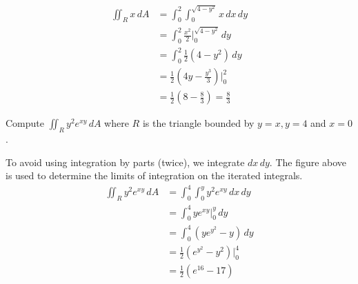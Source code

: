\documentclass[handout]{ximera}
\begin{document}
\begin{example}[Example 2]
\begin{align*}
\iint_R x \, dA & = \int_0^2 \int_0^{\sqrt{4 - y^2}} x \, dx \, dy\\
                 & = \int_0^2  \frac{x^2}{2} \bigg|_{0}^{\sqrt{4 - y^2}} \, dy\\
                 & = \int_0^2  \frac12(4-y^2) \, dy\\
                 &= \frac12 \left(4y - \frac{y^3}{3}\right)  \bigg|_0^2\\
                 &= \frac12 \left(8 - \frac83\right) = \frac{8}{3}
\end{align*} 





\end{example}


\begin{example}[Example 3]
Compute $\iint_R y^2 e^{xy} \, dA$ where $R$ is the triangle bounded by $y = x, y=4$ and $x=0$.\\

\begin{image}
\end{image}

To avoid using integration by parts (twice), we integrate $dx\, dy$.  
The figure above is used to determine the limits of integration on the iterated integrals.
\begin{align*}
\iint_R y^2 e^{xy} \, dA & = \int_0^4 \int_0^{y} y^2 e^{xy} \, dx \, dy\\
                 & = \int_0^4 y e^{xy} \bigg|_{0}^{y} \, dy\\
                 & = \int_0^4  \left(ye^{y^2} - y \right)\, dy\\
                 &= \frac12 \left(e^{y^2} - y^2\right) \bigg|_0^4\\
                 &= \frac12 \left(e^{16} - 17\right)
\end{align*} 

\end{example}
\end{document}
